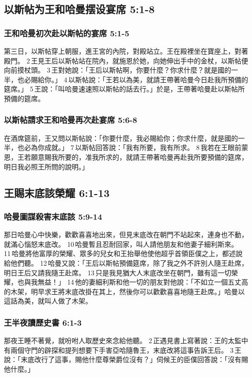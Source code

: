 \subsection{以斯帖为王和哈曼摆设宴席 5:1-8}
\subsubsection{王和哈曼初次赴以斯帖的宴席 5:1-5}
第三日，以斯帖穿上朝服，進王宮的內院，對殿站立。王在殿裡坐在寶座上，對著殿門。 2 王見王后以斯帖站在院內，就施恩於她，向她伸出手中的金杖，以斯帖便向前摸杖頭。 3 王對她說：「王后以斯帖啊，你要什麼？你求什麼？就是國的一半，也必賜給你。」 4 以斯帖說：「王若以為美，就請王帶著哈曼今日赴我所預備的筵席。」
5 王說：「叫哈曼速速照以斯帖的話去行。」於是，王帶著哈曼赴以斯帖所預備的筵席。 

\subsubsection{以斯帖請求王和哈曼再次赴宴席 5:6-8}
在酒席筵前，王又問以斯帖說：「你要什麼，我必賜給你；你求什麼，就是國的一半，也必為你成就。」 7 以斯帖回答說：「我有所要，我有所求。 8 我若在王眼前蒙恩，王若願意賜我所要的，准我所求的，就請王帶著哈曼再赴我所要預備的筵席，明日我必照王所問的說明。」





\subsection{王賜末底該榮耀 6:1-13}
\subsubsection{哈曼圖謀殺害末底該 5:9-14}
那日哈曼心中快樂，歡歡喜喜地出來，但見末底改在朝門不站起來，連身也不動，就滿心惱怒末底改。 10 哈曼暫且忍耐回家，叫人請他朋友和他妻子細利斯來。 11 哈曼將他富厚的榮耀、眾多的兒女和王抬舉他使他超乎首領臣僕之上，都述說給他們聽。 12 哈曼又說：「王后以斯帖預備筵席，除了我之外不許別人隨王赴席，明日王后又請我隨王赴席。 13 只是我見猶大人末底改坐在朝門，雖有這一切榮耀，也與我無益！」 14 他的妻細利斯和他一切的朋友對他說：「不如立一個五丈高的木架，明早求王將末底改掛在其上，然後你可以歡歡喜喜地隨王赴席。」哈曼以這話為美，就叫人做了木架。

\subsubsection{王半夜讀歷史書 6:1-3}
那夜王睡不著覺，就吩咐人取歷史來念給他聽。 2 正遇見書上寫著說：王的太監中有兩個守門的辟探和提列想要下手害亞哈隨魯王，末底改將這事告訴王后。 3 王說：「末底改行了這事，賜他什麼尊榮爵位沒有？」伺候王的臣僕回答說：「沒有賜他什麼。」

